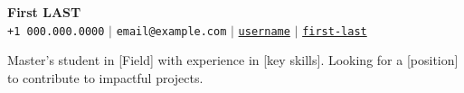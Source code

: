 \begin{center}
    \textbf{\Huge First LAST} \\ \vspace{5pt}
    \small
    \faPhone* \texttt{+1 000.000.0000} \hspace{1pt} $|$
    \hspace{1pt} \faEnvelope \hspace{2pt} \texttt{email@example.com} \hspace{1pt} $|$
    \hspace{1pt} \faGithub \hspace{2pt}
    \href{https://github.com/username}{\texttt{username}} \hspace{1pt} $|$
    \hspace{1pt} \faLinkedin \hspace{2pt}
    \href{https://www.linkedin.com/in/first-last/}{\texttt{first-last}}
    \\ \vspace{-10pt}
\end{center}

\vspace{-6pt}

\begin{center}
\small{
Master's student in [Field] with experience in [key skills]. Looking for a [position] to contribute to impactful projects.
}
\end{center}

\vspace{-10pt}
